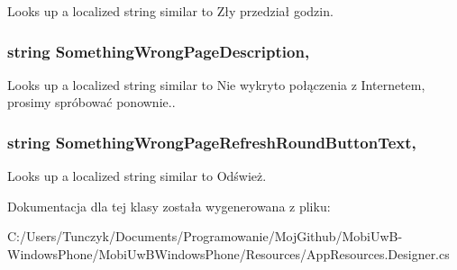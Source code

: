 Looks up a localized string similar to Zły przedział godzin. 

\hypertarget{a00006_a24740ffa7fdeabfaf9a59e78e23728f0}{}
\subsubsection[{Something\+Wrong\+Page\+Description}]{\setlength{\rightskip}{0pt plus 5cm}string Something\+Wrong\+Page\+Description\hspace{0.3cm}{\ttfamily [static]}, {\ttfamily [get]}}\label{a00006_a24740ffa7fdeabfaf9a59e78e23728f0}


Looks up a localized string similar to Nie wykryto połączenia z Internetem, prosimy spróbować ponownie.. 

\hypertarget{a00006_abf5a27b0043d37eb3f6c4c9ab021ac31}{}
\subsubsection[{Something\+Wrong\+Page\+Refresh\+Round\+Button\+Text}]{\setlength{\rightskip}{0pt plus 5cm}string Something\+Wrong\+Page\+Refresh\+Round\+Button\+Text\hspace{0.3cm}{\ttfamily [static]}, {\ttfamily [get]}}\label{a00006_abf5a27b0043d37eb3f6c4c9ab021ac31}


Looks up a localized string similar to Odśwież. 



Dokumentacja dla tej klasy została wygenerowana z pliku\+:\begin{DoxyCompactItemize}
\item 
C\+:/\+Users/\+Tunczyk/\+Documents/\+Programowanie/\+Moj\+Github/\+Mobi\+Uw\+B-\/\+Windows\+Phone/\+Mobi\+Uw\+B\+Windows\+Phone/\+Resources/App\+Resources.\+Designer.\+cs\end{DoxyCompactItemize}
